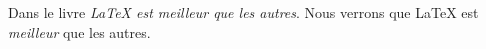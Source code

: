 \documentclass[12pt,a4paper,twoside]{article}
\begin{document}
Dans le livre \textit{\LaTeX{} est
\emph{meilleur} que les autres}.
Nous verrons que \LaTeX{} est
\emph{meilleur} que les autres.
\end{document}
